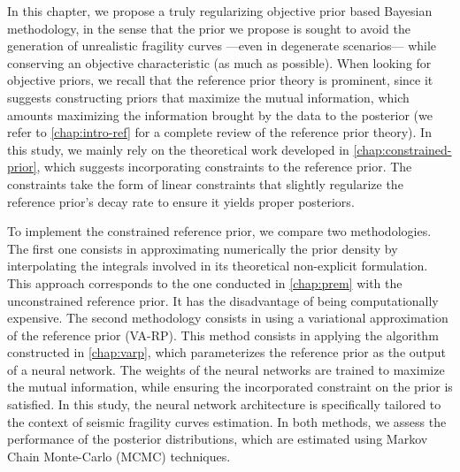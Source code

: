 




In this chapter, we propose a truly regularizing objective prior based Bayesian methodology, in the sense that the prior we propose is sought to avoid the generation of unrealistic fragility curves ---even in degenerate scenarios--- while conserving an objective characteristic (as much as possible).
When looking for objective priors, we recall that the reference prior theory is prominent, since it suggests constructing priors that maximize the mutual information,  which amounts maximizing the information brought by the data to the posterior (we refer to   \cref{chap:intro-ref} for a complete review of the reference prior theory).
In this study, we
mainly rely on the theoretical work developed in   \cref{chap:constrained-prior}, which suggests incorporating constraints to the reference prior. %
The constraints %
take the form of linear constraints that slightly regularize the reference prior's decay rate to ensure it yields proper posteriors.


To implement the constrained reference prior, we compare two methodologies.
The first one consists in approximating numerically the prior density by interpolating the integrals involved in its theoretical non-explicit formulation. %
This approach corresponds to the one conducted in   \cref{chap:prem} with the unconstrained reference prior. It has the disadvantage of being computationally expensive.
The second methodology consists in using a variational approximation of the reference prior (VA-RP).
This method consists in applying the algorithm constructed in   \cref{chap:varp}, which parameterizes the reference prior as the output of a neural network.
The weights of the neural networks are trained to maximize the mutual information, while ensuring the incorporated constraint on the prior is satisfied.
In this study, the neural network architecture is specifically tailored to the context of seismic fragility curves estimation.
In both methods, we assess the performance of the posterior distributions, which are estimated using Markov Chain Monte-Carlo (MCMC) techniques.


